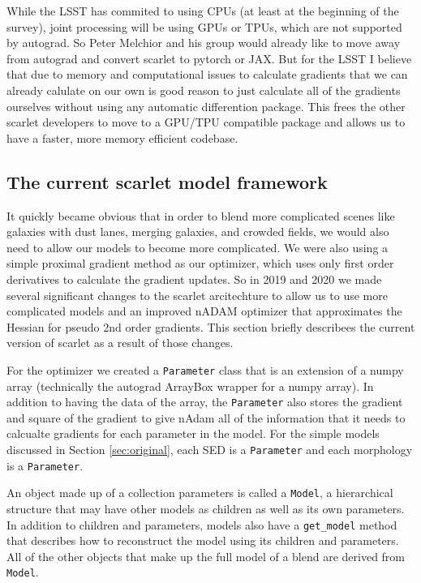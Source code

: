 \documentclass[DM,authoryear,toc]{lsstdoc}
\begin{document}
While the LSST has commited to using CPUs (at least at the beginning of the survey), joint processing will be using GPUs or TPUs, which are not supported by autograd. So Peter Melchior and his group would already like to move away from autograd and convert scarlet to pytorch or JAX. But for the LSST I believe that due to memory and computational issues to calculate gradients that we can already calulate on our own is good reason to just calculate all of the gradients ourselves without using any automatic differention package. This frees the other scarlet developers to move to a GPU/TPU compatible package and allows us to have a faster, more memory efficient codebase.

\subsection{The current scarlet model framework}

It quickly became obvious that in order to blend more complicated scenes like galaxies with dust lanes, merging galaxies, and crowded fields, we would also need to allow our models to become more complicated. We were also using a simple proximal gradient method as our optimizer, which uses only first order derivatives to calculate the gradient updates. So in 2019 and 2020 we made several significant changes to the scarlet arcitechture to allow us to use more complicated models and an improved nADAM optimizer that approximates the Hessian for pseudo 2nd order gradients. This section briefly describees the current version of scarlet as a result of those changes.

For the optimizer we created a \texttt{Parameter} class that is an extension of a numpy array (technically the autograd ArrayBox wrapper for a numpy array). In addition to having the data of the array, the \texttt{Parameter} also stores the gradient and square of the gradient to give nAdam all of the information that it needs to calcualte gradients for each parameter in the model. For the simple models discussed in Section \ref{sec:original}, each SED is a \texttt{Parameter} and each morphology is a \texttt{Parameter}.

An object made up of a collection parameters is called a \texttt{Model}, a hierarchical structure that may have other models as children as well as its own parameters. In addition to children and parameters, models also have a \texttt{get\_model} method that describes how to reconstruct the model using its children and parameters. All of the other objects that make up the full model of a blend are derived from \texttt{Model}.
\end{document}
